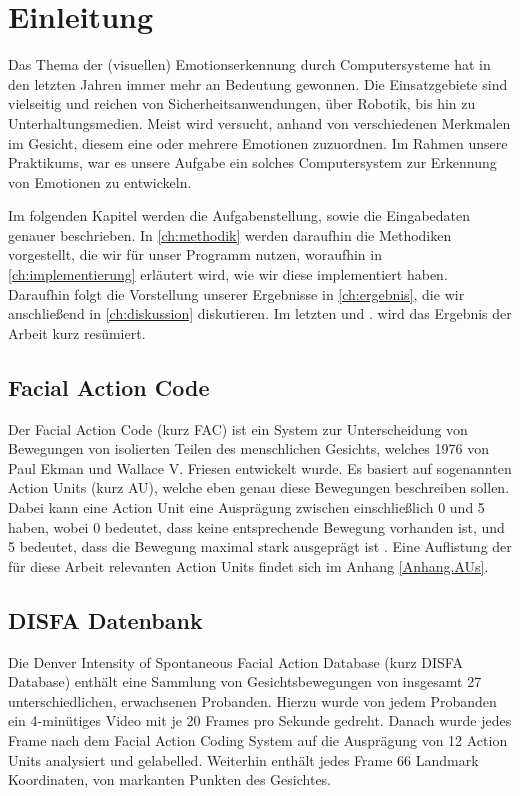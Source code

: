 \chapter{Einleitung}
\label{ch:einleitung}

Das Thema der (visuellen) Emotionserkennung durch Computersysteme hat in den letzten Jahren immer mehr an Bedeutung gewonnen.
Die Einsatzgebiete sind vielseitig und reichen von Sicherheitsanwendungen, über Robotik, bis hin zu Unterhaltungsmedien.
Meist wird versucht, anhand von verschiedenen Merkmalen im Gesicht, diesem eine oder mehrere Emotionen zuzuordnen. Im Rahmen
unsere Praktikums, war es unsere Aufgabe ein solches Computersystem zur Erkennung von Emotionen zu entwickeln.

Im folgenden Kapitel werden die Aufgabenstellung, sowie die Eingabedaten genauer beschrieben.
In \cref{ch:methodik} werden daraufhin die Methodiken vorgestellt, die wir für unser Programm nutzen, woraufhin in \cref{ch:implementierung} erläutert wird,
wie wir diese implementiert haben. Daraufhin folgt die Vorstellung unserer
Ergebnisse in \cref{ch:ergebnis}, die wir anschließend in \cref{ch:diskussion}
diskutieren. Im letzten und .  wird das Ergebnis der Arbeit kurz resümiert.

\section{Facial Action Code}
Der Facial Action Code (kurz FAC) ist ein System zur Unterscheidung von Bewegungen von isolierten Teilen des menschlichen Gesichts, welches
1976 von Paul Ekman und Wallace V. Friesen entwickelt wurde. Es basiert auf sogenannten Action Units (kurz AU), welche eben genau diese Bewegungen
beschreiben sollen. Dabei kann eine Action Unit eine Ausprägung zwischen einschließlich 0 und 5 haben, wobei 0 bedeutet, dass keine entsprechende
Bewegung vorhanden ist, und 5 bedeutet, dass die Bewegung maximal stark ausgeprägt ist \cite{ekman}. Eine Auflistung der für diese Arbeit relevanten Action Units
findet sich im Anhang \ref{Anhang.AUs}.

\section{DISFA Datenbank}
Die Denver Intensity of Spontaneous Facial Action Database (kurz DISFA Database) enthält eine Sammlung von Gesichtsbewegungen von insgesamt
27 unterschiedlichen, erwachsenen Probanden. Hierzu wurde von jedem Probanden ein 4-minütiges Video mit je 20 Frames pro Sekunde gedreht.
Danach wurde jedes Frame nach dem Facial Action Coding System auf die Ausprägung von 12 Action Units analysiert und gelabelled.\newline
Weiterhin enthält jedes Frame 66 Landmark Koordinaten, von markanten Punkten des Gesichtes.

